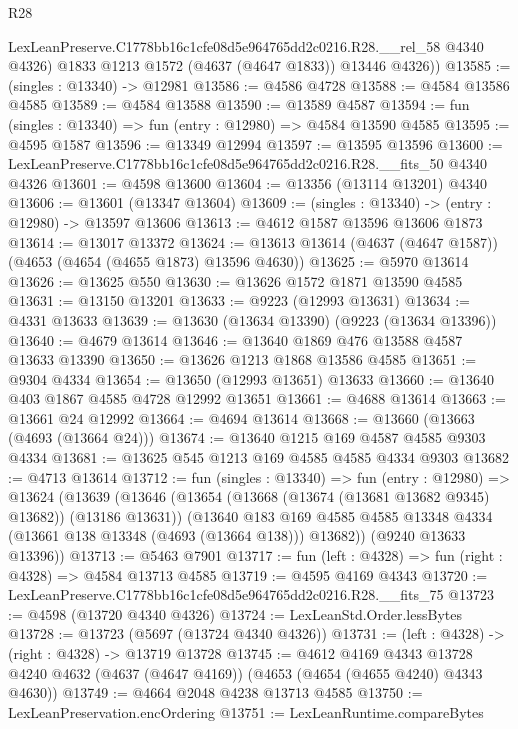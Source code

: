 \begin{lexlean}{R28}
\begin{coremodule}
        LexLeanPreserve.C1778bb16c1cfe08d5e964765dd2c0216.R28.__rel_58 @4340 @4326)
        @1833
        @1213
        @1572
        (@4637 (@4647 @1833))
        @13446
        @4326))
@13585 := (singles : @13340) -> @12981
@13586 := @4586 @4728
@13588 := @4584 @13586 @4585
@13589 := @4584 @13588
@13590 := @13589 @4587
@13594 := fun (singles : @13340) => fun (entry : @12980) => @4584 @13590 @4585
@13595 := @4595 @1587
@13596 := @13349 @12994
@13597 := @13595 @13596
@13600 := LexLeanPreserve.C1778bb16c1cfe08d5e964765dd2c0216.R28.__fits_50 @4340 @4326
@13601 := @4598 @13600
@13604 := @13356 (@13114 @13201) @4340
@13606 := @13601 (@13347 @13604)
@13609 := (singles : @13340) -> (entry : @12980) -> @13597 @13606
@13613 := @4612 @1587 @13596 @13606 @1873
@13614 := @13017 @13372
@13624 := @13613 @13614 (@4637 (@4647 @1587)) (@4653 (@4654 (@4655 @1873) @13596 @4630))
@13625 := @5970 @13614
@13626 := @13625 @550
@13630 := @13626 @1572 @1871 @13590 @4585
@13631 := @13150 @13201
@13633 := @9223 (@12993 @13631)
@13634 := @4331 @13633
@13639 := @13630 (@13634 @13390) (@9223 (@13634 @13396))
@13640 := @4679 @13614
@13646 := @13640 @1869 @476 @13588 @4587 @13633 @13390
@13650 := @13626 @1213 @1868 @13586 @4585
@13651 := @9304 @4334
@13654 := @13650 (@12993 @13651) @13633
@13660 := @13640 @403 @1867 @4585 @4728 @12992 @13651
@13661 := @4688 @13614
@13663 := @13661 @24 @12992
@13664 := @4694 @13614
@13668 := @13660 (@13663 (@4693 (@13664 @24)))
@13674 := @13640 @1215 @169 @4587 @4585 @9303 @4334
@13681 := @13625 @545 @1213 @169 @4585 @4585 @4334 @9303
@13682 := @4713 @13614
@13712 := fun (singles : @13340) =>
  fun (entry : @12980) =>
  @13624
    (@13639
      (@13646
        (@13654 (@13668 (@13674 (@13681 @13682 @9345) @13682)) (@13186 @13631))
        (@13640
          @183
          @169
          @4585
          @4585
          @13348
          @4334
          (@13661 @138 @13348 (@4693 (@13664 @138)))
          @13682))
      (@9240 @13633 @13396))
@13713 := @5463 @7901
@13717 := fun (left : @4328) => fun (right : @4328) => @4584 @13713 @4585
@13719 := @4595 @4169 @4343
@13720 := LexLeanPreserve.C1778bb16c1cfe08d5e964765dd2c0216.R28.__fits_75
@13723 := @4598 (@13720 @4340 @4326)
@13724 := LexLeanStd.Order.lessBytes
@13728 := @13723 (@5697 (@13724 @4340 @4326))
@13731 := (left : @4328) -> (right : @4328) -> @13719 @13728
@13745 := @4612
    @4169
    @4343
    @13728
    @4240
    @4632
    (@4637 (@4647 @4169))
    (@4653 (@4654 (@4655 @4240) @4343 @4630))
@13749 := @4664 @2048 @4238 @13713 @4585
@13750 := LexLeanPreservation.encOrdering
@13751 := LexLeanRuntime.compareBytes

\end{coremodule}
\end{lexlean}
